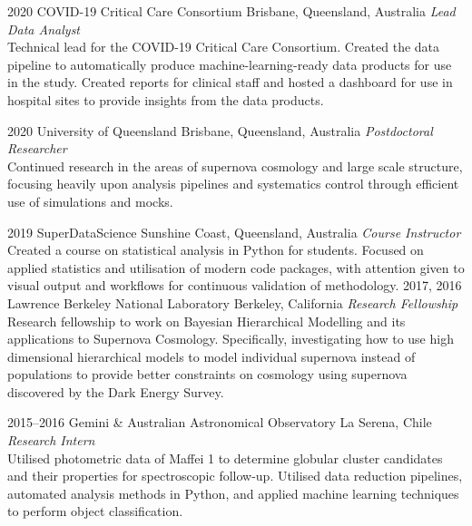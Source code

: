 \begin{entrylist}

\entry
{2020}
{COVID-19 Critical Care Consortium}
{Brisbane, Queensland, Australia}
{\emph{Lead Data Analyst} \\
Technical lead for the COVID-19 Critical Care Consortium. Created the data pipeline to automatically produce machine-learning-ready data products for use in the study. Created reports for clinical staff and hosted a dashboard for use in hospital sites to provide insights from the data products.}


\entry
{2020}
{University of Queensland}
{Brisbane, Queensland, Australia}
{\emph{Postdoctoral Researcher} \\
Continued research in the areas of supernova cosmology and large scale structure, focusing heavily upon analysis pipelines and systematics control through efficient use of simulations and mocks.}

\entry
{2019}
{SuperDataScience}
{Sunshine Coast, Queensland, Australia}
{\emph{Course Instructor} \\
Created a course on statistical analysis in Python for students. Focused on applied statistics and utilisation of modern code packages, with attention given to visual output and workflows for continuous validation of methodology.}
\entry
{2017, 2016}
{Lawrence Berkeley National Laboratory}
{Berkeley, California}
{\emph{Research Fellowship} \\
	Research fellowship to work on Bayesian Hierarchical Modelling and its applications to Supernova Cosmology. Specifically, investigating how to use high dimensional hierarchical models to model individual supernova instead of populations to provide better constraints on cosmology using supernova discovered by the Dark Energy Survey.}


\entry
{2015--2016}
{Gemini \& Australian Astronomical Observatory}
{La Serena, Chile}
{\emph{Research Intern} \\
Utilised photometric data of Maffei 1 to determine globular cluster candidates and their properties for spectroscopic follow-up. Utilised data reduction pipelines, automated analysis methods in Python, and applied machine learning techniques to perform object classification.}


\end{entrylist}
